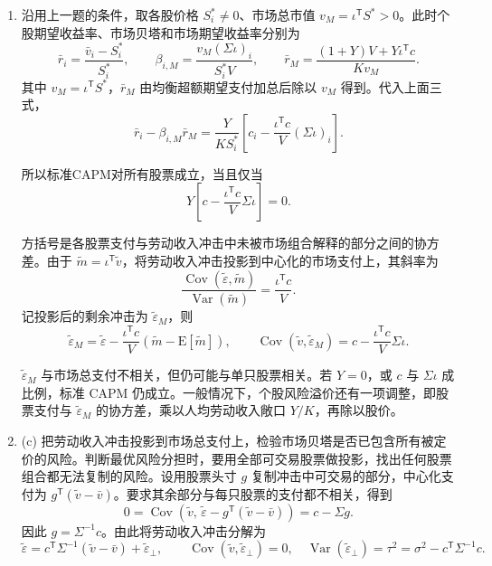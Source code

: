 \begin{solution}[blank-type=manual,blank-vsep=9\baselineskip]
\begin{enumerate}[label=(\alph*)]
均衡持仓为 $\theta_k^*=\iota/K+(Y/K-y_k)h$，加总恰为 $\iota$。债券头寸为 $b_k^*=(S^*)^{\mathsf T}(\bar\theta_k-\theta_k^*)$，加总为零。与上一题相比，股票的超额期望支付多出 $Yc/K$，这是劳动收入冲击与股票相关带来的定价调整。

\item 沿用上一题的条件，取各股价格 $S_i^*\ne0$、市场总市值 $v_M=\iota^{\mathsf T}S^*>0$。此时个股期望收益率、市场贝塔和市场期望收益率分别为
\[
 \bar r_i=\frac{\bar v_i-S_i^*}{S_i^*},\qquad
 \beta_{i,M}=\frac{v_M(\Sigma\iota)_i}{S_i^*V},\qquad
 \bar r_M=\frac{(1+Y)V+Y\iota^{\mathsf T}c}{Kv_M}.
\]
其中 $v_M=\iota^{\mathsf T}S^*$，$\bar r_M$ 由均衡超额期望支付加总后除以 $v_M$ 得到。代入上面三式，
\[
 \boxed{\bar r_i-\beta_{i,M}\bar r_M
 =\frac{Y}{KS_i^*}\left[c_i-\frac{\iota^{\mathsf T}c}{V}(\Sigma\iota)_i\right]}.
\]

所以标准CAPM对所有股票成立，当且仅当
\[
 Y\left[c-\frac{\iota^{\mathsf T}c}{V}\Sigma\iota\right]=0.
\]

方括号是各股票支付与劳动收入冲击中未被市场组合解释的部分之间的协方差。由于 $\widetilde m=\iota^{\mathsf T}\widetilde v$，将劳动收入冲击投影到中心化的市场支付上，其斜率为
\[
 \frac{\operatorname{Cov}(\widetilde\varepsilon,\widetilde m)}
 {\operatorname{Var}(\widetilde m)}
 =\frac{\iota^{\mathsf T}c}{V}.
\]
记投影后的剩余冲击为 $\widetilde\varepsilon_M$，则
\[
 \widetilde\varepsilon_M
 =\widetilde\varepsilon-\frac{\iota^{\mathsf T}c}{V}
    (\widetilde m-\mathrm E[\widetilde m]),\qquad
 \operatorname{Cov}(\widetilde v,\widetilde\varepsilon_M)
 =c-\frac{\iota^{\mathsf T}c}{V}\Sigma\iota.
\]

$\widetilde\varepsilon_M$ 与市场总支付不相关，但仍可能与单只股票相关。若 $Y=0$，或 $c$ 与 $\Sigma\iota$ 成比例，标准 CAPM 仍成立。一般情况下，个股风险溢价还有一项调整，即股票支付与 $\widetilde\varepsilon_M$ 的协方差，乘以人均劳动收入敞口 $Y/K$，再除以股价。

\item (c) 把劳动收入冲击投影到市场总支付上，检验市场贝塔是否已包含所有被定价的风险。判断最优风险分担时，要用全部可交易股票做投影，找出任何股票组合都无法复制的风险。设用股票头寸 $g$ 复制冲击中可交易的部分，中心化支付为 $g^{\mathsf T}(\widetilde v-\bar v)$。要求其余部分与每只股票的支付都不相关，得到
\[
 0=\operatorname{Cov}\!\left(\widetilde v,\,
       \widetilde\varepsilon-g^{\mathsf T}(\widetilde v-\bar v)\right)
   =c-\Sigma g.
\]
因此 $g=\Sigma^{-1}c$。由此将劳动收入冲击分解为
\[
 \widetilde\varepsilon=c^{\mathsf T}\Sigma^{-1}(\widetilde v-\bar v)
 +\widetilde\varepsilon_\perp,\qquad
 \operatorname{Cov}(\widetilde v,\widetilde\varepsilon_\perp)=0,
 \quad\operatorname{Var}(\widetilde\varepsilon_\perp)=\tau^2
 =\sigma^2-c^{\mathsf T}\Sigma^{-1}c.
\]


\end{enumerate}
\end{solution}
